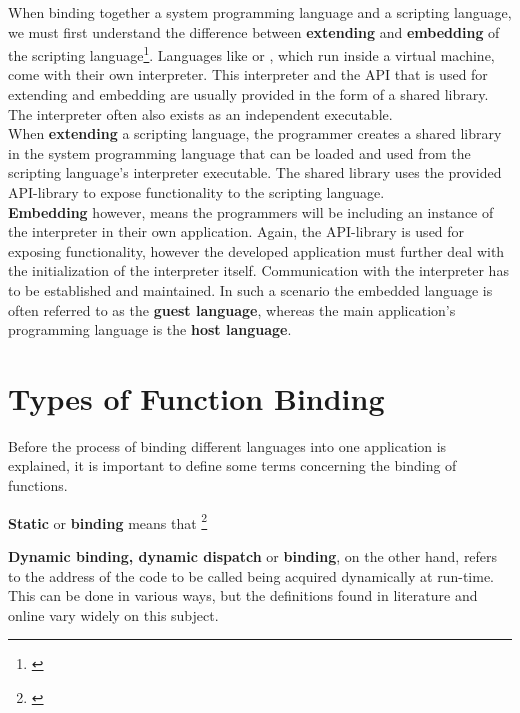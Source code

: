 When binding together a system programming language and a scripting language, we must first understand the difference between \textbf{extending} and \textbf{embedding} of the scripting language\footnote{\citep{PythonHP}}. Languages like  or , which run inside a virtual machine, come with their own interpreter. This interpreter and the API that is used for extending and embedding are usually provided in the form of a shared library. The interpreter often also exists as an independent executable. \\
When \textbf{extending} a scripting language, the programmer creates a shared library in the system programming language that can be loaded and used from the scripting language's interpreter executable. The shared library uses the provided API-library to expose functionality to the scripting language.\\
\textbf{Embedding} however, means the programmers will be including an instance of the interpreter in their own application. Again, the API-library is used for exposing functionality, however the developed application must further deal with the initialization of the interpreter itself. Communication with the interpreter has to be established and maintained. In such a scenario the embedded language is often referred to as the \textbf{guest language}, whereas the main application's programming language is the \textbf{host language}.

\section{Types of Function Binding}
\label{sec:TypesOfFunctionBinding}

Before the process of binding different languages into one application is explained, it is important to define some terms concerning the binding of functions.

\textbf{Static} or \textbf{ binding} means that \footnote{\citep[41]{ThinkingInCPP}}

\textbf{Dynamic binding, dynamic dispatch} or \textbf{ binding}, on the other hand, refers to the address of the code to be called being acquired dynamically at run-time. This can be done in various ways, but the definitions found in literature and online vary widely on this subject.

